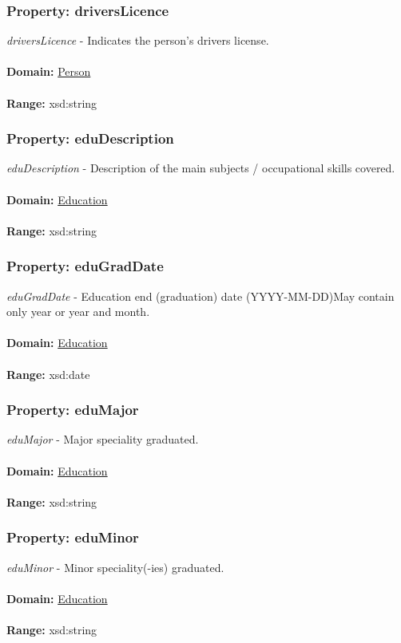 \documentclass[a4paper,12pt]{article}
\numberwithin{equation}{section}
\begin{document}
\subsubsection{Property: driversLicence}\hypertarget{driversLicence}{}
\textit{driversLicence} - Indicates the person's drivers license.
\\\\
\textbf{Domain:} \hyperlink{Person}{Person} 
\\\\
\textbf{Range:}  xsd:string

\subsubsection{Property: eduDescription}\hypertarget{eduDescription}{}
\textit{eduDescription} - Description of the main subjects / occupational skills covered.
\\\\
\textbf{Domain:} \hyperlink{Education}{Education} 
\\\\
\textbf{Range:}  xsd:string

\subsubsection{Property: eduGradDate}\hypertarget{eduGradDate}{}
\textit{eduGradDate} - Education end (graduation) date (YYYY-MM-DD)May contain only year or year and month.
\\\\
\textbf{Domain:} \hyperlink{Education}{Education} 
\\\\
\textbf{Range:}  xsd:date

\subsubsection{Property: eduMajor}\hypertarget{eduMajor}{}
\textit{eduMajor} - Major speciality graduated.
\\\\
\textbf{Domain:} \hyperlink{Education}{Education} 
\\\\
\textbf{Range:}  xsd:string

\subsubsection{Property: eduMinor}\hypertarget{eduMinor}{}
\textit{eduMinor} - Minor speciality(-ies) graduated.
\\\\
\textbf{Domain:} \hyperlink{Education}{Education} 
\\\\
\textbf{Range:}  xsd:string
\end{document}
